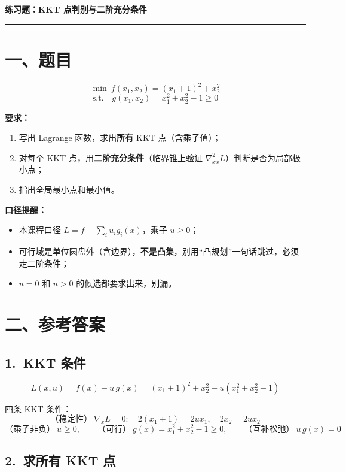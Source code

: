 \documentclass[11pt]{ctexart}
\begin{document}
\begin{center}\Large\bfseries 练习题：KKT 点判别与二阶充分条件\end{center}
\vspace{2pt}
\hrule
\vspace{6pt}

\section*{一、题目}

\[
\min\ f(x_1,x_2)=(x_1+1)^2+x_2^2
\]
\[
\text{s.t.}\quad g(x_1,x_2)=x_1^2+x_2^2-1\ge 0
\]

\textbf{要求：}
\begin{enumerate}
\item 写出 Lagrange 函数，求出\textbf{所有} KKT 点（含乘子值）；
\item 对每个 KKT 点，用\textbf{二阶充分条件}（临界锥上验证 $\nabla^2_{xx}L$）判断是否为局部极小点；
\item 指出全局最小点和最小值。
\end{enumerate}

\textbf{口径提醒：}
\begin{itemize}
\item 本课程口径 $L=f-\sum_i u_i g_i(x)$，乘子 $u\ge 0$；
\item 可行域是单位圆盘外（含边界），\textbf{不是凸集}，别用``凸规划''一句话跳过，必须走二阶条件；
\item $u=0$ 和 $u>0$ 的候选都要求出来，别漏。
\end{itemize}

\section*{二、参考答案}

\subsection*{1.\ KKT 条件}

\[
L(x,u)=f(x)-u\,g(x)=(x_1+1)^2+x_2^2-u(x_1^2+x_2^2-1)
\]

四条 KKT 条件：
\[
\text{（稳定性）}\ \nabla_x L=0:\quad 2(x_1+1)=2u x_1,\quad 2x_2=2u x_2
\]
\[
\text{（乘子非负）}\ u\ge 0,\qquad
\text{（可行）}\ g(x)=x_1^2+x_2^2-1\ge 0,\qquad
\text{（互补松弛）}\ u\,g(x)=0
\]

\subsection*{2.\ 求所有 KKT 点}
\end{document}
